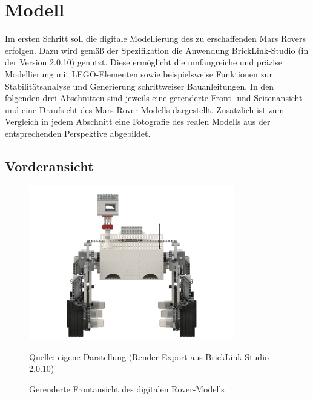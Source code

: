 \chapter{Modell}
\label{chp:modell}

Im ersten Schritt soll die digitale Modellierung des zu erschaffenden Mars Rovers erfolgen.
Dazu wird gemäß der Spezifikation die Anwendung BrickLink-Studio (in der Version 2.0.10) genutzt.
Diese ermöglicht die umfangreiche und präzise Modellierung mit LEGO-Elementen sowie beispielsweise Funktionen zur Stabilitätsanalyse und Generierung schrittweiser Bauanleitungen.
In den folgenden drei Abschnitten sind jeweils eine gerenderte Front- und Seitenansicht und eine Draufsicht des Mars-Rover-Modells dargestellt.
Zusätzlich ist zum Vergleich in jedem Abschnitt eine Fotografie des realen Modells aus der entsprechenden Perspektive abgebildet.

\section{Vorderansicht}
\label{sec:voderansicht}

\begin{figure}
	\centering
	\includegraphics[width=0.8\textwidth]{../Images/20200429_Mars_Rover_V5_front.png}
	\vspace{0.5em}
	\parbox[c]{0.8\linewidth}{\footnotesize
		\centering
		\vspace{1em}
		Quelle: eigene Darstellung (Render-Export aus BrickLink Studio 2.0.10)
	}
	\caption{Gerenderte Frontansicht des digitalen Rover-Modells}
	\label{fig:roverfrontrender}
\end{figure}

